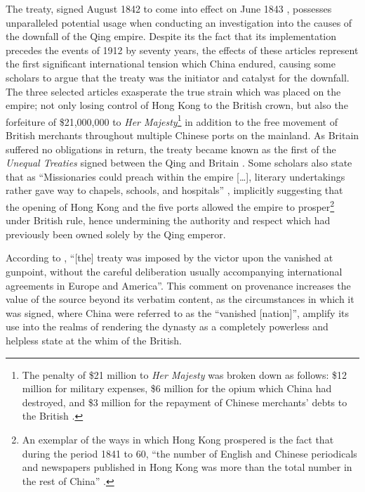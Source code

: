 \documentclass[a4paper,oneside]{article}
\begin{document}

The treaty, signed  August 1842 to come into effect on  June
1843 \autocite{Saw:1975}, possesses unparalleled potential usage when conducting
an investigation into the causes of the downfall of the Qing empire. Despite its
the fact that its implementation precedes the events of 1912 by seventy years,
the effects of these articles represent the first significant international
tension which China endured, causing some scholars to argue that the treaty was
the initiator and catalyst for the downfall. The three selected articles
exasperate the true strain which was placed on the empire; not only losing
control of Hong Kong to the British crown, but also the forfeiture of
\$21,000,000 to \textit{Her Majesty}\footnote{The penalty of \$21 million to
\textit{Her Majesty} was broken down as follows: \$12 million for military
expenses, \$6 million for the opium which China had destroyed, and \$3 million
for the repayment of Chinese merchants' debts to the British
\autocite{Hsu:1999}.} in addition to the free movement of British merchants
throughout multiple Chinese ports on the mainland. As Britain suffered no
obligations in return, the treaty became known as the first of the
\textit{Unequal Treaties} signed between the Qing and Britain
\autocite{Hoe:1999}. Some scholars also state that as ``Missionaries could
preach within the empire [\ldots], literary undertakings rather gave way to
chapels, schools, and hospitals'' \autocite{Britton:1933}, implicitly suggesting
that the opening of Hong Kong and the five ports allowed the empire to
prosper\footnote{An exemplar of the ways in which Hong Kong prospered is the
fact that during the period 1841 to 60, ``the number of English and Chinese
periodicals and newspapers published in Hong Kong was more than the total number
in the rest of China'' \autocite{Huang:2001}.} under British rule, hence
undermining the authority and respect which had previously been owned solely by
the Qing emperor.

According to \autocite{Hsu:1999}, ``[the] treaty was imposed by the victor upon
the vanished at gunpoint, without the careful deliberation usually accompanying
international agreements in Europe and America''.  This comment on provenance
increases the value of the source beyond its verbatim content, as the
circumstances in which it was signed, where China were referred to as the
``vanished [nation]'', amplify its use into the realms of rendering the dynasty
as a completely powerless and helpless state at the whim of the British.
\end{document}
